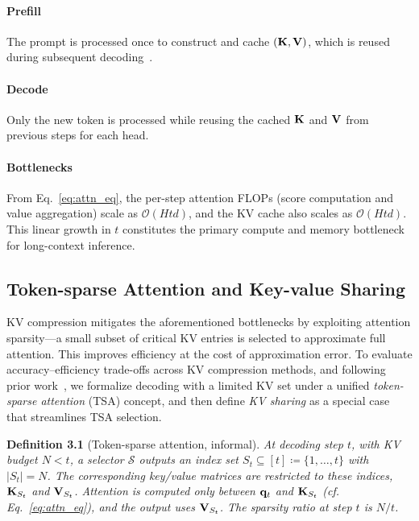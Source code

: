 \paragraph{Prefill} The prompt is processed once to construct and cache $(\mathbf{K},\mathbf{V})$, which is reused during subsequent decoding~\cite{ott2019fairseq}.

\paragraph{Decode} Only the new token is processed while reusing the cached $\mathbf{K}$ and $\mathbf{V}$ from previous steps for each head.

\paragraph{Bottlenecks} From Eq.~\eqref{eq:attn_eq}, the per-step attention FLOPs (score computation and value aggregation) scale as $\mathcal{O}(Htd)$, and the KV cache also scales as $\mathcal{O}(Htd)$. This linear growth in $t$ constitutes the primary compute and memory bottleneck for long-context inference.



\subsection{Token-sparse Attention and Key-value Sharing}
\label{sec:prob_def}

KV compression mitigates the aforementioned bottlenecks by exploiting attention sparsity—a small subset of critical KV entries is selected to approximate full attention. This improves efficiency at the cost of approximation error. To evaluate accuracy–efficiency trade-offs across KV compression methods, and following prior work~\cite{xiao2024duoattention,wu2024tokenselect,wuhshare,liu2025freekv}, we formalize decoding with a limited KV set under a unified \emph{token-sparse attention} (TSA) concept, and then define \emph{KV sharing} as a special case that streamlines TSA selection.


\textbf{Definition 3.1} (Token-sparse attention, informal).
\textit{At decoding step $t$, with KV budget $N < t$, a selector $\mathcal{S}$ outputs an index set $S_t \subseteq [t] \coloneqq \{1,\dots,t\}$ with $|S_t| = N$. The corresponding key/value matrices are restricted to these indices, $\mathbf{K}_{S_t}$ and $\mathbf{V}_{S_t}$. Attention is computed only between $\mathbf{q}_t$ and $\mathbf{K}_{S_t}$ (cf. Eq.~\eqref{eq:attn_eq}), and the output uses $\mathbf{V}_{S_t}$. The sparsity ratio at step $t$ is $N/t$.}


